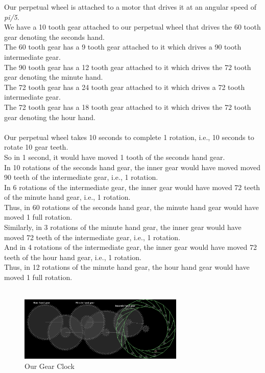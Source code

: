 \documentclass[10pt]{article} \usepackage[a4paper,left=0.8in,right=0.8in,top=0.4in,bottom=0.8in]{geometry} \usepackage{graphicx}
\begin{document}
Our perpetual wheel is attached to a motor that drives it at an angular speed of \textit{pi/5}.\\
We have a 10 tooth gear attached to our perpetual wheel that drives the 60 tooth gear denoting the seconds hand.\\
The 60 tooth gear has a 9 tooth gear attached to it which drives a 90 tooth intermediate gear.\\
The 90 tooth gear has a 12 tooth gear attached to it which drives the 72 tooth gear denoting the minute hand.\\
The 72 tooth gear has a 24 tooth gear attached to it which drives a 72 tooth intermediate gear.\\
The 72 tooth gear has a 18 tooth gear attached to it which drives the 72 tooth gear denoting the hour hand.\\
\\
Our perpetual wheel takes 10 seconds to complete 1 rotation, i.e., 10 seconds to rotate 10 gear teeth.\\
So in 1 second, it would have moved 1 tooth of the seconds hand gear.\\
In 10 rotations of the seconds hand gear, the inner gear would have moved moved 90 teeth of the intermediate gear, i.e., 1 rotation.\\
In 6 rotations of the intermediate gear, the inner gear would have moved 72 teeth of the minute hand gear, i.e., 1 rotation.\\
Thus, in 60 rotations of the seconds hand gear, the minute hand gear would have moved 1 full rotation.\\
Similarly, in 3 rotations of the minute hand gear, the inner gear would have moved 72 teeth of the intermediate gear, i.e., 1 rotation.\\
And in 4 rotations of the intermediate gear, the inner gear would have moved 72 teeth of the hour hand gear, i.e., 1 rotation.\\
Thus, in 12 rotations of the minute hand gear, the hour hand gear would have moved 1 full rotation.\\
\\

\begin{figure}[ht!]
\centering
\includegraphics[width=0.7\textwidth]{images/clock.png}
\caption{Our Gear Clock}
\end{figure}
\end{document}
